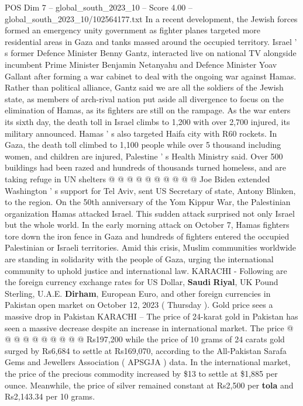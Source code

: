 \begin{textsample}{POS Dim 7 – global\_south\_2023\_10 – Score 4.00 – global\_south\_2023\_10/102564177.txt}  \label{ex:f7_pos_138}
In a recent development, the Jewish forces formed an emergency unity government as fighter planes targeted more residential areas in Gaza and tanks massed around the occupied territory.
Israel ' s former Defence Minister Benny Gantz, interacted live on national TV alongside incumbent Prime Minister Benjamin Netanyahu and Defence Minister Yoav Gallant after forming a war cabinet to deal with the ongoing war against Hamas.
Rather than political alliance, Gantz said we are all the soldiers of the Jewish state, as members of arch-rival nation put aside all divergence to focus on the elimination of Hamas, as its fighters are still on the rampage.
As the war enters its sixth day, the death toll in Israel climbs to 1,200 with over 2,700 injured, its military announced.
Hamas ' s also targeted Haifa city with R60 rockets.
In Gaza, the death toll climbed to 1,100 people while over 5 thousand including women, and children are injured, Palestine ' s Health Ministry said.
Over 500 buildings had been razed and hundreds of thousands turned homeless, and are taking refuge in UN shelters @ @ @ @ @ @ @ @ @ @ Joe Biden extended Washington ' s support for Tel Aviv, sent US Secretary of state, Antony Blinken, to the region.
On the 50th anniversary of the Yom Kippur War, the Palestinian organization Hamas attacked Israel.
This sudden attack surprised not only Israel but the whole world.
In the early morning attack on October 7, Hamas fighters tore down the iron fence in Gaza and hundreds of fighters entered the occupied Palestinian or Israeli territories.
Amid this crisis, Muslim communities worldwide are standing in solidarity with the people of Gaza, urging the international community to uphold justice and international law.
KARACHI - Following are the foreign currency exchange rates for US Dollar, \textbf{Saudi} \textbf{Riyal}, UK Pound Sterling, U.A.E. \textbf{Dirham}, European Euro, and other foreign currencies in Pakistan open market on October 12, 2023 ( Thursday ).
Gold price sees a massive drop in Pakistan KARACHI -- The price of 24-karat gold in Pakistan has seen a massive decrease despite an increase in international market.
The price @ @ @ @ @ @ @ @ @ @ Rs197,200 while the price of 10 grams of 24 carats gold surged by Rs6,684 to settle at Rs169,070, according to the All-Pakistan Sarafa Gems and Jewellers Association ( APSGJA ) data.
In the international market, the price of the precious commodity increased by \$13 to settle at \$1,885 per ounce.
Meanwhile, the price of silver remained constant at Rs2,500 per \textbf{tola} and Rs2,143.34 per 10 grams.

\end{textsample}
